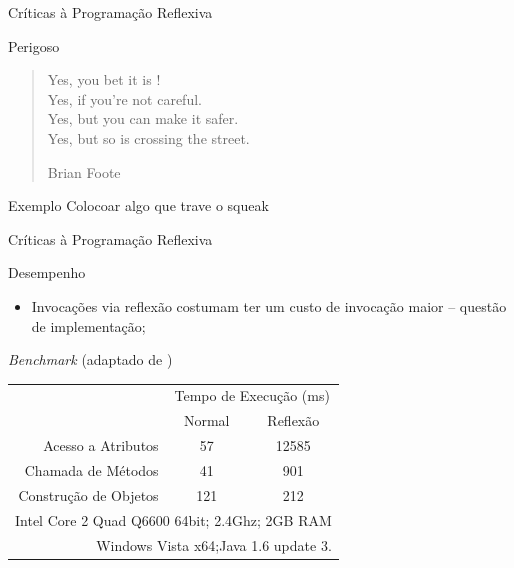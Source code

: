 \documentclass[12pt,t]{beamer}
\begin{document}
 	 \begin{frame}{Críticas à Programação Reflexiva}
 	 	\begin{block}{Perigoso}
 	 		\begin{quote}
				Yes, you bet it is ! \\
				Yes, if you're not careful. \\
				Yes, but you can make it safer. \\
				Yes, but so is crossing the street.
 	 			\begin{flushright}
 	 				Brian Foote
 	 			\end{flushright}
 	 		\end{quote}
 	 	\end{block}
 	 	\begin{exampleblock}{Exemplo}
 	 		\alert{Colocoar algo que trave o squeak}
 	 	\end{exampleblock}
 	 \end{frame}
	 \begin{frame}{Críticas à Programação Reflexiva}
 	 	\begin{block}{Desempenho}
 	 		\begin{itemize}
 	 			\item Invocações via reflexão costumam ter um custo de invocação maior -- \alert{questão de implementação};
 	 		\end{itemize}
 	 	\end{block}
 	 	\begin{block}{\emph{Benchmark} (adaptado de )}
			\begin{table}[h]
				\begin{tabular}{rcc}
					& \multicolumn{2}{c}{Tempo de Execução (ms)} \\
					& Normal              & Reflexão             \\
					\hline \hline
					Acesso a Atributos    & 57                  & 12585                \\
					Chamada de Métodos    & 41                  & 901                  \\
					Construção de Objetos & 121                 & 212                  \\ \hline
					\multicolumn{3}{r}{\footnotesize{Intel Core 2 Quad Q6600 64bit; 2.4Ghz; 2GB RAM}}\\
					\multicolumn{3}{r}{\footnotesize{Windows Vista x64;Java 1.6 update 3.}}\\										
					\hline
				\end{tabular}
			\end{table} 	 
 	 	\end{block}
 	 \end{frame}
\end{document}
